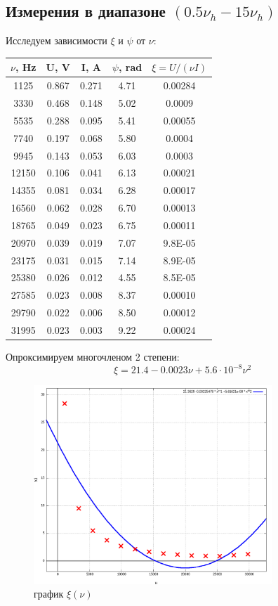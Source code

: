 \documentclass{article}
\begin{document}
\subsection{Измерения в диапазоне \((0.5\nu_h - 15\nu_h)\)}
Исследуем зависимости \(\xi\) и \(\psi\) от \(\nu\):
\begin{table}[H]
    \centering
    \begin{tabular}{|c|c|c|c|c|}
    \hline
    \(\nu\), Hz & U, V  & I, A  & \(\psi\), rad & \(\xi = U/(\nu I)\) \\\hline
    1125  & 0.867 & 0.271 & 4.71 & 0.00284 \\\hline
    3330  & 0.468 & 0.148 & 5.02 & 0.0009  \\\hline
    5535  & 0.288 & 0.095 & 5.41 & 0.00055 \\\hline
    7740  & 0.197 & 0.068 & 5.80 & 0.0004  \\\hline
    9945  & 0.143 & 0.053 & 6.03 & 0.0003  \\\hline
    12150 & 0.106 & 0.041 & 6.13 & 0.00021 \\\hline
    14355 & 0.081 & 0.034 & 6.28 & 0.00017 \\\hline
    16560 & 0.062 & 0.028 & 6.70 & 0.00013 \\\hline
    18765 & 0.049 & 0.023 & 6.75 & 0.00011 \\\hline
    20970 & 0.039 & 0.019 & 7.07 & 9.8E-05 \\\hline
    23175 & 0.031 & 0.015 & 7.14 & 8.9E-05 \\\hline
    25380 & 0.026 & 0.012 & 4.55 & 8.5E-05 \\\hline
    27585 & 0.023 & 0.008 & 8.37 & 0.00010 \\\hline
    29790 & 0.022 & 0.006 & 8.50 & 0.00012 \\\hline
    31995 & 0.023 & 0.003 & 9.22 & 0.00024 \\\hline
    \end{tabular}
\end{table}

Опроксимируем многочленом 2 степени:
\[ \xi = 21.4 - 0.0023\nu + 5.6\cdot 10^{-8}\nu^2 \]

\begin{figure}[H]
    \centering
    \includegraphics[width=0.8\textwidth]{4.png}
    \caption{график \( \xi(\nu) \)}
\end{figure}
\end{document}
